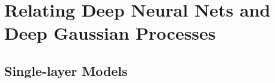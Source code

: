 






\section{Relating Deep Neural Nets and Deep Gaussian Processes}
\label{sec:relating}


\subsection{Single-layer Models}

\def\layersep{1.75cm}
\def\nodesep{.75cm}
\def\nodesize{.45cm}

